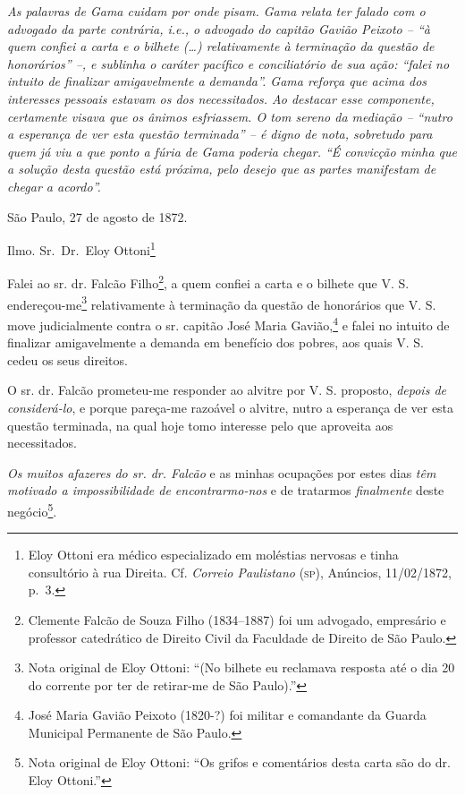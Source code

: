 \begin{didascalia}
\emph{As palavras de Gama cuidam por onde pisam. Gama relata ter falado
com o advogado da parte contrária, i.e., o advogado do capitão Gavião
Peixoto -- ``à quem confiei a carta e o bilhete (\ldots{}) relativamente à
terminação da questão de honorários'' --, e sublinha o caráter pacífico e
conciliatório de sua ação: ``falei no intuito de finalizar amigavelmente
a demanda''. Gama reforça que acima dos interesses pessoais estavam os
dos necessitados. Ao destacar esse componente, certamente visava que os
ânimos esfriassem. O tom sereno da mediação -- ``nutro a esperança de ver
esta questão terminada'' -- é digno de nota, sobretudo para quem já viu a
que ponto a fúria de Gama poderia chegar. ``É convicção minha que a
solução desta questão está próxima, pelo desejo que as partes manifestam
de chegar a acordo''.}
\end{didascalia}


São Paulo, 27 de agosto de 1872.

Ilmo. Sr.~Dr.~Eloy Ottoni\footnote{ Eloy Ottoni era médico
  especializado em moléstias nervosas e tinha consultório à rua Direita.
  Cf. \emph{Correio Paulistano} (\textsc{sp}), Anúncios, 11/02/1872, p.~3.}

Falei ao sr. dr. Falcão Filho\footnote{ Clemente Falcão de Souza Filho
  (1834--1887) foi um advogado, empresário e professor catedrático de
  Direito Civil da Faculdade de Direito de São Paulo.}, a quem confiei a
carta e o bilhete que V. S. endereçou-me\footnote{ Nota original de
  Eloy Ottoni: ``(No bilhete eu reclamava resposta até o dia 20 do
  corrente por ter de retirar-me de São Paulo).''} relativamente à
terminação da questão de honorários que V. S. move judicialmente contra
o sr. capitão José Maria Gavião,\footnote{ José Maria Gavião Peixoto
  (1820-?) foi militar e comandante da Guarda Municipal Permanente de
  São Paulo.} e falei no intuito de finalizar amigavelmente a demanda em
benefício dos pobres, aos quais V. S. cedeu os seus direitos.

O sr. dr. Falcão prometeu-me responder ao alvitre por V. S. proposto,
\emph{depois de considerá-lo}, e porque pareça-me razoável o alvitre,
nutro a esperança de ver esta questão terminada, na qual hoje tomo
interesse pelo que aproveita aos necessitados.

\emph{Os muitos afazeres do sr. dr. Falcão} e as minhas ocupações por
estes dias \emph{têm motivado a impossibilidade de encontrarmo-nos} e de
tratarmos \emph{finalmente} deste negócio\footnote{ Nota original de
  Eloy Ottoni: ``Os grifos e comentários desta carta são do dr. Eloy
  Ottoni.''}.

